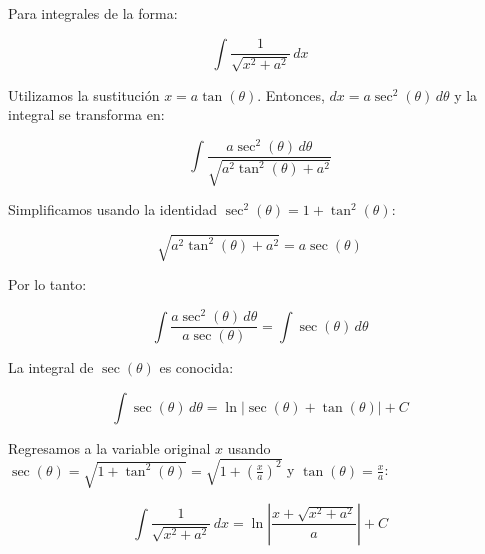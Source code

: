 Para integrales de la forma:

\[
\int \frac{1}{\sqrt{x^2 + a^2}} \, dx
\]

Utilizamos la sustitución \( x = a \tan(\theta) \). Entonces, \( dx = a \sec^2(\theta) \, d\theta \) y la integral se transforma en:

\[
\int \frac{a \sec^2(\theta) \, d\theta}{\sqrt{a^2 \tan^2(\theta) + a^2}}
\]

Simplificamos usando la identidad \(\sec^2(\theta) = 1 + \tan^2(\theta)\):

\[
\sqrt{a^2 \tan^2(\theta) + a^2} = a \sec(\theta)
\]

Por lo tanto:

\[
\int \frac{a \sec^2(\theta) \, d\theta}{a \sec(\theta)} = \int \sec(\theta) \, d\theta
\]

La integral de \(\sec(\theta)\) es conocida:

\[
\int \sec(\theta) \, d\theta = \ln|\sec(\theta) + \tan(\theta)| + C
\]

Regresamos a la variable original \( x \) usando \( \sec(\theta) = \sqrt{1 + \tan^2(\theta)} = \sqrt{1 + \left(\frac{x}{a}\right)^2} \) y \( \tan(\theta) = \frac{x}{a} \):

\[
\int \frac{1}{\sqrt{x^2 + a^2}} \, dx = \ln \left| \frac{x + \sqrt{x^2 + a^2}}{a} \right| + C
\]



\newpage

